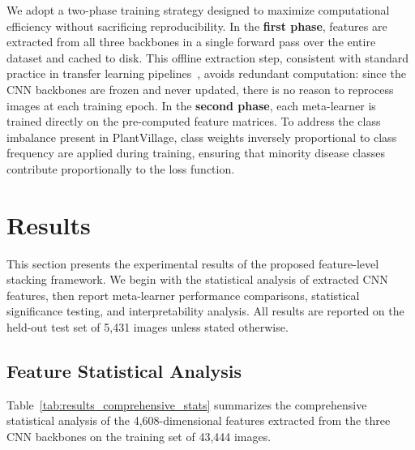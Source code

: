 \documentclass[pdflatex,sn-basic]{sn-jnl}
\begin{document}
We adopt a two-phase training strategy designed to maximize computational efficiency without sacrificing reproducibility. In the \textbf{first phase}, features are extracted from all three backbones in a single forward pass over the entire dataset and cached to disk. This offline extraction step, consistent with standard practice in transfer learning pipelines~\cite{pan2010survey}, avoids redundant computation: since the CNN backbones are frozen and never updated, there is no reason to reprocess images at each training epoch. In the \textbf{second phase}, each meta-learner is trained directly on the pre-computed feature matrices. To address the class imbalance present in PlantVillage, class weights inversely proportional to class frequency are applied during training, ensuring that minority disease classes contribute proportionally to the loss function.

\section{Results}
\label{sec:results}

This section presents the experimental results of the proposed feature-level stacking framework. We begin with the statistical analysis of extracted CNN features, then report meta-learner performance comparisons, statistical significance testing, and interpretability analysis. All results are reported on the held-out test set of 5,431 images unless stated otherwise.

\subsection{Feature Statistical Analysis}
\label{subsec:results_feature_stats}

Table~\ref{tab:results_comprehensive_stats} summarizes the comprehensive statistical analysis of the 4,608-dimensional features extracted from the three CNN backbones on the training set of 43,444 images.
\end{document}
